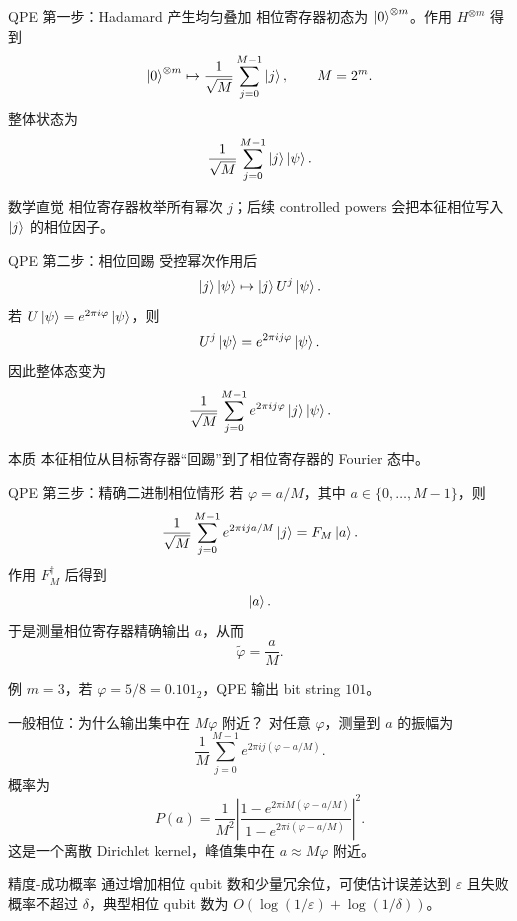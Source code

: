 \documentclass[aspectratio=169,10pt]{ctexbeamer}
\newcommand{\eps}{\varepsilon}
\begin{document}
\begin{frame}{QPE 第一步：Hadamard 产生均匀叠加}
相位寄存器初态为 $\ket0^{\otimes m}$。作用 $H^{\otimes m}$ 得到
\[
\ket0^{\otimes m}\mapsto \frac1{\sqrt M}\sum_{j=0}^{M-1}\ket j,
\qquad M=2^m.
\]
整体状态为
\[
\frac1{\sqrt M}\sum_{j=0}^{M-1}\ket j\ket\psi.
\]
\begin{exbox}{数学直觉}
相位寄存器枚举所有幂次 $j$；后续 controlled powers 会把本征相位写入 $\ket j$ 的相位因子。
\end{exbox}
\end{frame}

\begin{frame}{QPE 第二步：相位回踢}
受控幂次作用后
\[
\ket j\ket\psi\mapsto \ket j U^j\ket\psi.
\]
若 $U\ket\psi=e^{2\pi i\varphi}\ket\psi$，则
\[
U^j\ket\psi=e^{2\pi ij\varphi}\ket\psi.
\]
因此整体态变为
\[
\frac1{\sqrt M}\sum_{j=0}^{M-1}e^{2\pi ij\varphi}\ket j\ket\psi.
\]
\begin{keybox}{本质}
本征相位从目标寄存器“回踢”到了相位寄存器的 Fourier 态中。
\end{keybox}
\end{frame}

\begin{frame}{QPE 第三步：精确二进制相位情形}
若 $\varphi=a/M$，其中 $a\in\{0,\ldots,M-1\}$，则
\[
\frac1{\sqrt M}\sum_{j=0}^{M-1}e^{2\pi ija/M}\ket j=F_M\ket a.
\]
作用 $F_M^{\dagger}$ 后得到
\[
\ket a.
\]
于是测量相位寄存器精确输出 $a$，从而
\[
\tilde\varphi=\frac{a}{M}.
\]
\begin{exbox}{例}
$m=3$，若 $\varphi=5/8=0.101_2$，QPE 输出 bit string $101$。
\end{exbox}
\end{frame}

\begin{frame}{一般相位：为什么输出集中在 $M\varphi$ 附近？}
对任意 $\varphi$，测量到 $a$ 的振幅为
\[
\frac1M\sum_{j=0}^{M-1}e^{2\pi ij(\varphi-a/M)}.
\]
概率为
\[
P(a)=\frac1{M^2}\left|\frac{1-e^{2\pi iM(\varphi-a/M)}}{1-e^{2\pi i(\varphi-a/M)}}\right|^2.
\]
这是一个离散 Dirichlet kernel，峰值集中在 $a\approx M\varphi$ 附近。
\begin{keybox}{精度-成功概率}
通过增加相位 qubit 数和少量冗余位，可使估计误差达到 $\eps$ 且失败概率不超过 $\delta$，典型相位 qubit 数为 $O(\log(1/\eps)+\log(1/\delta))$。
\end{keybox}
\end{frame}
\end{document}

